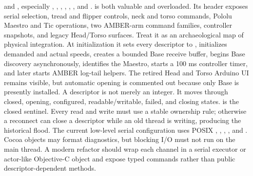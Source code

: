 {}
\markdownRendererSectionEnd \markdownRendererSectionBegin
{}\markdownRendererInterblockSeparator
{}\markdownRendererBlockQuoteBegin
{}  and , especially , , , , , , and .\markdownRendererBlockQuoteEnd \markdownRendererInterblockSeparator
{} is both valuable and overloaded. Its header exposes serial selection, tread and flipper controls, neck and torso commands, Pololu Maestro and Tic operations, two AMBER-arm command families, controller snapshots, and legacy Head/Torso surfaces. Treat it as an archaeological map of physical integration.\markdownRendererParagraphSeparator
{}At initialization it sets every descriptor to , initializes demanded and actual speeds, creates a bounded Base receive buffer, begins Base discovery asynchronously, identifies the Maestro, starts a 100 ms controller timer, and later starts AMBER log-tail helpers. The retired Head and Torso Arduino UI remains visible, but automatic opening is commented out because only Base is presently installed.\markdownRendererInterblockSeparator
{}\markdownRendererSectionBegin
{}\markdownRendererInterblockSeparator
{}A descriptor is not merely an integer. It moves through closed, opening, configured, readable/writable, failed, and closing states.  is the closed sentinel. Every read and write must use a stable ownership rule; otherwise a reconnect can close a descriptor while an old thread is writing, producing the historical  flood.\markdownRendererParagraphSeparator
{}The current low-level serial configuration uses POSIX , , , , and . Cocoa objects may format diagnostics, but blocking I/O must not run on the main thread. A modern refactor should wrap each channel in a serial executor or actor-like Objective-C object and expose typed commands rather than public descriptor-dependent methods.\markdownRendererInterblockSeparator
